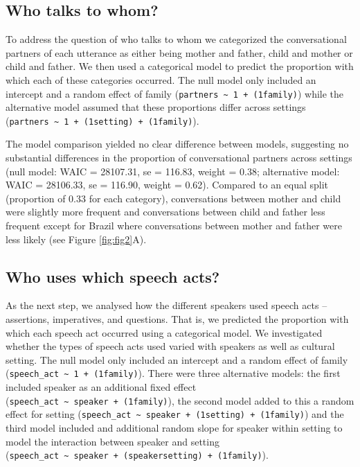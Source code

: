 \documentclass[
  man,floatsintext]{apa6}
\begin{document}
\hypertarget{who-talks-to-whom}{%
\subsection{Who talks to whom?}\label{who-talks-to-whom}}

To address the question of who talks to whom we categorized the conversational partners of each utterance as either being mother and father, child and mother or child and father. We then used a categorical model to predict the proportion with which each of these categories occurred. The null model only included an intercept and a random effect of family (\texttt{partners\ \textasciitilde{}\ 1\ +\ (1\textbar{}family)}) while the alternative model assumed that these proportions differ across settings (\texttt{partners\ \textasciitilde{}\ 1\ +\ (1\textbar{}setting)\ +\ (1\textbar{}family)}).

The model comparison yielded no clear difference between models, suggesting no substantial differences in the proportion of conversational partners across settings (null model: WAIC = 28107.31, se = 116.83, weight = 0.38; alternative model: WAIC = 28106.33, se = 116.90, weight = 0.62). Compared to an equal split (proportion of 0.33 for each category), conversations between mother and child were slightly more frequent and conversations between child and father less frequent except for Brazil where conversations between mother and father were less likely (see Figure \ref{fig:fig2}A).

\hypertarget{who-uses-which-speech-acts}{%
\subsection{Who uses which speech acts?}\label{who-uses-which-speech-acts}}

As the next step, we analysed how the different speakers used speech acts -- assertions, imperatives, and questions. That is, we predicted the proportion with which each speech act occurred using a categorical model. We investigated whether the types of speech acts used varied with speakers as well as cultural setting. The null model only included an intercept and a random effect of family (\texttt{speech\_act\ \textasciitilde{}\ 1\ +\ (1\textbar{}family)}). There were three alternative models: the first included speaker as an additional fixed effect (\texttt{speech\_act\ \textasciitilde{}\ speaker\ +\ (1\textbar{}family)}), the second model added to this a random effect for setting (\texttt{speech\_act\ \textasciitilde{}\ speaker\ +\ (1\textbar{}setting)\ +\ (1\textbar{}family)}) and the third model included and additional random slope for speaker within setting to model the interaction between speaker and setting (\texttt{speech\_act\ \textasciitilde{}\ speaker\ +\ (speaker\textbar{}setting)\ +\ (1\textbar{}family)}).
\end{document}

